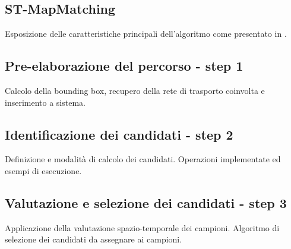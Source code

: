 \subsection{ST-MapMatching}
Esposizione delle caratteristiche principali dell'algoritmo come presentato in \cite{stmapmatching}.
\subsection{Pre-elaborazione del percorso - step 1}
Calcolo della bounding box, recupero della rete di trasporto coinvolta e inserimento a sistema.
\subsection{Identificazione dei candidati - step 2}
Definizione e modalità di calcolo dei candidati. Operazioni implementate ed esempi di esecuzione.
\subsection{Valutazione e selezione dei candidati - step 3}
Applicazione della valutazione spazio-temporale dei campioni. Algoritmo di selezione dei candidati da assegnare ai campioni. 